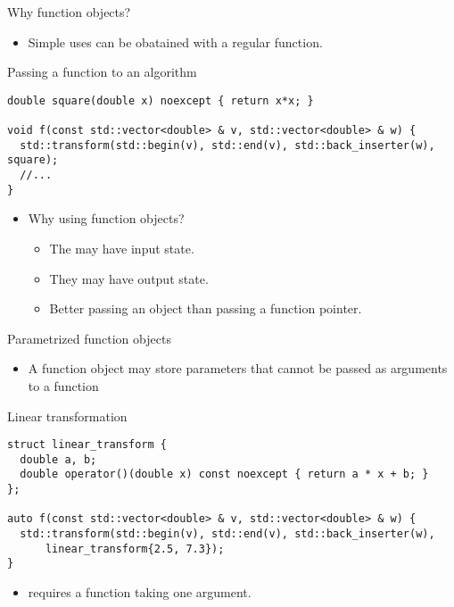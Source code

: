 \begin{frame}[t,fragile]{Why function objects?}
\begin{itemize}
  \item Simple uses can be obatained with a regular function.
\end{itemize}
\begin{block}{Passing a function to an algorithm}
\begin{lstlisting}
double square(double x) noexcept { return x*x; }

void f(const std::vector<double> & v, std::vector<double> & w) {
  std::transform(std::begin(v), std::end(v), std::back_inserter(w), square);
  //...
}
\end{lstlisting}
\end{block}

\begin{itemize}
  \item Why using function objects?
    \begin{itemize}
      \item The may have input state.
      \item They may have output state.
      \item Better passing an object than passing a function pointer.
    \end{itemize}
\end{itemize}

\end{frame}

\begin{frame}[t,fragile]{Parametrized function objects}
\begin{itemize}
  \item A function object may store parameters that cannot be passed
        as arguments to a function
\end{itemize}
\begin{block}{Linear transformation}
\begin{lstlisting}
struct linear_transform {
  double a, b;
  double operator()(double x) const noexcept { return a * x + b; }
};

auto f(const std::vector<double> & v, std::vector<double> & w) {
  std::transform(std::begin(v), std::end(v), std::back_inserter(w), 
      linear_transform{2.5, 7.3});
}
\end{lstlisting}
\end{block}

\begin{itemize}
  \item {} requires a function taking one argument.
\end{itemize}
\end{frame}

